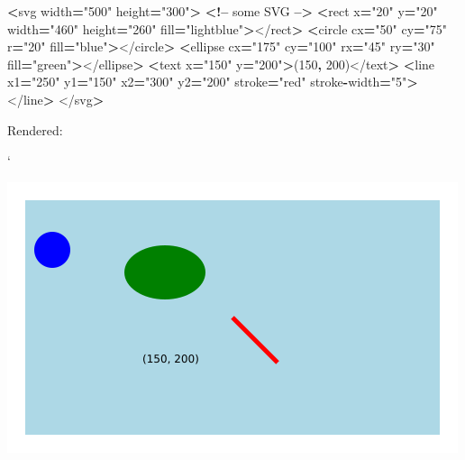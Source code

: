 \documentclass[openany]{book}
\newenvironment{Shaded}{\begin{snugshade}}{\end{snugshade}}
\newcommand{\DecValTok}[1]{\textcolor[rgb]{0.00,0.00,0.81}{#1}}
\newcommand{\NormalTok}[1]{#1}
\newcommand{\OperatorTok}[1]{\textcolor[rgb]{0.81,0.36,0.00}{\textbf{#1}}}
\newcommand{\StringTok}[1]{\textcolor[rgb]{0.31,0.60,0.02}{#1}}
\begin{document}
\begin{Shaded}
\begin{Highlighting}[]
\OperatorTok{<}\NormalTok{svg width}\OperatorTok{=}\StringTok{"500"}\NormalTok{ height}\OperatorTok{=}\StringTok{"300"}\OperatorTok{>}  \OperatorTok{<!--}\NormalTok{ some SVG }\OperatorTok{-->}
    \OperatorTok{<}\NormalTok{rect x}\OperatorTok{=}\StringTok{"20"}\NormalTok{ y}\OperatorTok{=}\StringTok{"20"}\NormalTok{ width}\OperatorTok{=}\StringTok{"460"}\NormalTok{ height}\OperatorTok{=}\StringTok{"260"}\NormalTok{ fill}\OperatorTok{=}\StringTok{"lightblue"}\OperatorTok{>}\NormalTok{</rect}\OperatorTok{>}
    \OperatorTok{<}\NormalTok{circle cx}\OperatorTok{=}\StringTok{"50"}\NormalTok{ cy}\OperatorTok{=}\StringTok{"75"}\NormalTok{ r}\OperatorTok{=}\StringTok{"20"}\NormalTok{ fill}\OperatorTok{=}\StringTok{"blue"}\OperatorTok{>}\NormalTok{</circle}\OperatorTok{>}
    \OperatorTok{<}\NormalTok{ellipse cx}\OperatorTok{=}\StringTok{"175"}\NormalTok{ cy}\OperatorTok{=}\StringTok{"100"}\NormalTok{ rx}\OperatorTok{=}\StringTok{"45"}\NormalTok{ ry}\OperatorTok{=}\StringTok{"30"}\NormalTok{ fill}\OperatorTok{=}\StringTok{"green"}\OperatorTok{>}\NormalTok{</ellipse}\OperatorTok{>}
    \OperatorTok{<}\NormalTok{text x}\OperatorTok{=}\StringTok{"150"}\NormalTok{ y}\OperatorTok{=}\StringTok{"200"}\OperatorTok{>}\NormalTok{(}\DecValTok{150}\OperatorTok{,} \DecValTok{200}\NormalTok{)</text}\OperatorTok{>}
    \OperatorTok{<}\NormalTok{line x1}\OperatorTok{=}\StringTok{"250"}\NormalTok{ y1}\OperatorTok{=}\StringTok{"150"}\NormalTok{ x2}\OperatorTok{=}\StringTok{"300"}\NormalTok{ y2}\OperatorTok{=}\StringTok{"200"}\NormalTok{ stroke}\OperatorTok{=}\StringTok{"red"}\NormalTok{ stroke}\OperatorTok{-}\NormalTok{width}\OperatorTok{=}\StringTok{"5"}\OperatorTok{>}\NormalTok{</line}\OperatorTok{>}
\NormalTok{</svg}\OperatorTok{>}
\end{Highlighting}
\end{Shaded}

Rendered:

`

\includegraphics[width=0.5\linewidth]{images/shapessvg}
\end{document}
